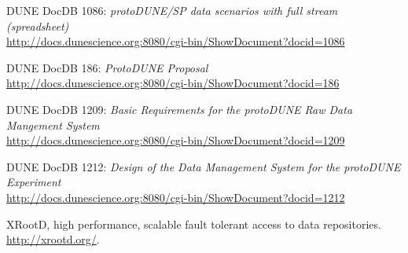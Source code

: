 \documentclass[pdftex,12pt,letter]{article}
\begin{document}
\begin{thebibliography}{1}
{DUNE DocDB 1086: \textit{ protoDUNE/SP data scenarios with full stream (spreadsheet)}}\\
\url{http://docs.dunescience.org:8080/cgi-bin/ShowDocument?docid=1086}

{DUNE DocDB 186: \textit{ ProtoDUNE Proposal}}\\
\url{http://docs.dunescience.org:8080/cgi-bin/ShowDocument?docid=186}


{DUNE DocDB 1209: \textit{Basic Requirements for the protoDUNE Raw Data Mangement System}}\\
\url{http://docs.dunescience.org:8080/cgi-bin/ShowDocument?docid=1209}


{DUNE DocDB 1212: \textit{Design of the Data Management System for the protoDUNE Experiment}}\\
\url{http://docs.dunescience.org:8080/cgi-bin/ShowDocument?docid=1212}



{XRootD, high performance, scalable fault tolerant access to data  repositories}.\\
  \url{http://xrootd.org/}.

\end{thebibliography}
\end{document}
